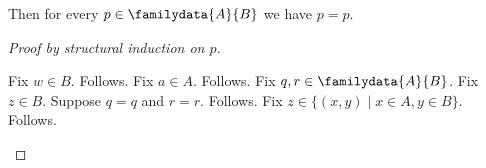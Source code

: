

\begin{proposition}\label{family_induction}
    Then for every $p\in\familydata{A}{B}$ we have $p=p$.
\end{proposition}
\begin{proof}[Proof by structural induction on $p$]
    \begin{byCase}
            Fix $w\in B$.
            Follows.
            Fix $a\in A$.
            Follows.
            Fix $q,r\in\familydata{A}{B}$.
            Fix $z\in B$.
            Suppose $q=q$ and $r=r$.
            Follows.
            Fix $z\in\{(x,y)\mid x\in A,y\in B\}$.
            Follows.
    \end{byCase}
\end{proof}
